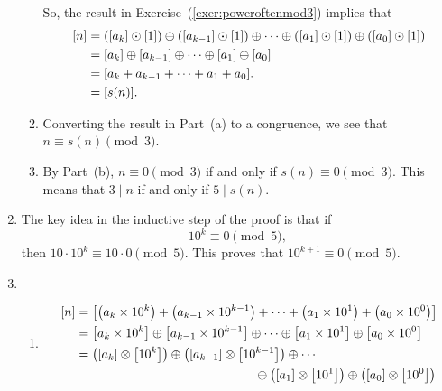 \begin{enumerate}
\begin{enumerate}
So, the result in Exercise~(\ref{exer:poweroftenmod3}) implies that
\begin{align} \notag
[ n ] &= \left( {[ {a_k } ] \odot [ 1 ]} \right) \oplus \left( {[ {a_{k - 1} } ] \odot [ 1 ]} \right) \oplus  \cdots  \oplus \left( {[ {a_1 } ] \odot [ 1 ]} \right) \oplus \left( {[ {a_0 } ] \odot [ 1 ]} \right)  \notag \\ 
                 &= [ {a_k } ] \oplus [ {a_{k - 1} } ] \oplus  \cdots  \oplus [ {a_1 } ] \oplus [ {a_0 } ] \notag \\ 
                 &= [ {a_k  + a_{k - 1}  +  \cdots  + a_1  + a_0 } ]. \notag \\
                 &= [ s( n ) ]. \notag
\end{align}
\item Converting the result in Part~(a) to a congruence, we see that \\ 
$n \equiv s(n)  \pmod 3$.

\item By Part~(b),  $n \equiv 0 \pmod 3$  if and only if  
$ s(n)  \equiv 0 \pmod 3$.  This means that $3 \mid n$ if and only if  
$5 \mid s(n) $.
\end{enumerate}



\item The key idea in the inductive step of the proof is that if
\[
10^k \equiv 0 \pmod 5,
\]
then $10 \cdot 10^k \equiv 10 \cdot 0 \pmod 5$.  This proves that $10^{k+1} \equiv 0 \pmod 5$.



\item \begin{enumerate}
\item 
\begin{align}
  \left[ n \right] &= \left[ {\left( {a_k  \times 10^k } \right) + \left( {a_{k - 1}  \times 10^{k - 1} } \right) +  \cdots  + \left( {a_1  \times 10^1 } \right) + \left( {a_0  \times 10^0 } \right)} \right] \notag \\ 
   &= \left[ {a_k  \times 10^k } \right] \oplus \left[ {a_{k - 1}  \times 10^{k - 1} } \right] \oplus  \cdots  \oplus \left[ {a_1  \times 10^1 } \right] \oplus \left[ {a_0  \times 10^0 } \right] \notag \\
  &= \left( {\left[ {a_k } \right] \otimes \left[ {10^k } \right]} \right) \oplus \left( {\left[ {a_{k - 1} } \right] \otimes \left[ {10^{k - 1} } \right]} \right) \oplus  \cdots \notag \\ 
  & \hspace{5cm} \oplus \left( {\left[ {a_1 } \right] \otimes \left[ {10^1 } \right]} \right) \oplus \left( {\left[ {a_0 } \right] \otimes \left[ {10^0 } \right]} \right) \notag  
\end{align}


\end{enumerate}
\end{enumerate}
